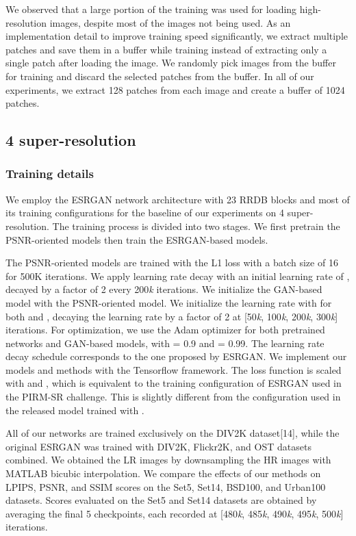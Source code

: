 \documentclass{article}
\begin{document}
We observed that a large portion of the training was used for loading high-resolution images, despite most of the images not being used. As an implementation detail to improve training speed significantly, we extract multiple patches and save them in a buffer while training instead of extracting only a single patch after loading the image. We randomly pick images from the buffer for training and discard the selected patches from the buffer. In all of our experiments, we extract 128 patches from each image and create a buffer of 1024 patches.

\subsection{4 super-resolution}

\subsubsection{Training details}

We employ the ESRGAN network architecture with 23 RRDB blocks and most of its training configurations for the baseline of our experiments on 4 super-resolution. The training process is divided into two stages. We first pretrain the PSNR-oriented models then train the ESRGAN-based models.

The PSNR-oriented models are trained with the L1 loss with a batch size of 16 for 500K iterations. We apply learning rate decay with an initial learning rate of , decayed by a factor of 2 every 200\textit{k} iterations. We initialize the GAN-based model with the PSNR-oriented model. We initialize the learning rate with  for both  and , decaying the learning rate by a factor of 2 at [50\textit{k}, 100\textit{k}, 200\textit{k}, 300\textit{k}] iterations. For optimization, we use the Adam optimizer for both pretrained networks and GAN-based models, with  = 0.9 and  = 0.99. The learning rate decay schedule corresponds to the one proposed by ESRGAN. We implement our models and methods with the Tensorflow framework. The loss function is scaled with  and , which is equivalent to the training configuration of ESRGAN used in the PIRM-SR challenge. This is slightly different from the configuration used in the released model trained with .

All of our networks are trained exclusively on the DIV2K dataset[14], while the original ESRGAN was trained with DIV2K, Flickr2K, and OST datasets combined. We obtained the LR images by downsampling the HR images with MATLAB bicubic interpolation. We compare the effects of our methods on LPIPS, PSNR, and SSIM scores on the Set5, Set14, BSD100, and Urban100 datasets. Scores evaluated on the Set5 and Set14 datasets are obtained by averaging the final 5 checkpoints, each recorded at [480\textit{k}, 485\textit{k}, 490\textit{k}, 495\textit{k}, 500\textit{k}] iterations.
\end{document}
